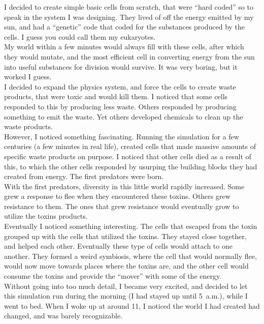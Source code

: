 \documentclass[a5paper]{scrartcl}
\begin{document}
I decided to create simple basic cells from scratch, that were \enquote{hard coded} so to speak in the system I was designing. They lived of off the energy emitted by my sun, and had a \enquote{genetic} code that coded for the substances produced by the cells. I guess you could call them my eukaryotes.\\


My world within a few minutes would always fill with these cells, after which they would mutate, and the most efficient cell in converting energy from the sun into useful substances for division would survive. It was very boring, but it worked I guess.\\


I decided to expand the physics system, and force the cells  to create waste products, that were toxic and would kill them. I noticed that some cells responded to this by producing less waste. Others responded by producing something to emit the waste. Yet others developed chemicals to clean up the waste products.\\


However, I noticed something fascinating. Running the simulation for a few centuries (a few minutes in real life), created cells that made massive amounts of specific waste products on purpose. I noticed that other cells died as a result of this, to which the other cells responded by usurping the building blocks they had created from energy. The first predators were born.\\


With the first predators, diversity in this little world rapidly increased. Some grew a response to flee when they encountered these toxins. Others grew resistance to them. The ones that grew resistance would eventually grow to utilize the toxins products.\\


Eventually I noticed something interesting. The cells that escaped from the toxin grouped up with the cells that utilized the toxins. They stayed close together, and helped each other. Eventually these type of cells would attach to one another. They formed a weird symbiosis, where the cell that would normally flee, would now move towards places where the toxins are, and the other cell would consume the toxins and provide the \enquote{mover} with some of the energy.\\


Without going into too much detail, I became very excited, and decided to let this simulation run during the morning (I had stayed up until 5~a.m.), while I went to bed. When I woke up at around 11, I noticed the world I had created had changed, and was barely recognizable. \\
\end{document}
